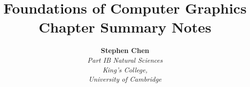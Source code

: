 
\usepackage{helvet}

\usepackage{fancyhdr}
\pagestyle{fancy}
\lhead{}
\rhead{\leftmark}

\usepackage{titling}
\preauthor{\begin{flushright}} %
\postauthor{\par \end{flushright}}
\predate{\begin{flushright} \large}
\postdate{\par \end{flushright}}

\title{\textbf{Foundations of Computer Graphics} \\ \large Chapter Summary Notes}
\author{\Large \textbf{Stephen Chen}\vspace{5pt}
\\ \large \textit{Part IB Natural Sciences}
\\ \large \textit{King's College,}
\\ \large \textit{University of Cambridge}
}
\date{}

\usepackage{amssymb}
\renewcommand{\labelitemi}{$\star$}

\usepackage{amsmath}
